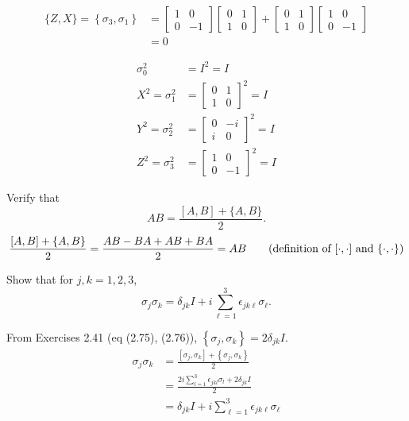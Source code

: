 \begin{align*}
\{Z, X\} = \left\{\sigma_3, \sigma_1 \right\} &= \begin{bmatrix}
1 & 0 \\
0 & -1
\end{bmatrix}
\begin{bmatrix}
0 & 1 \\
1 & 0
\end{bmatrix}
+
\begin{bmatrix}
0 & 1 \\
1 & 0
\end{bmatrix}
\begin{bmatrix}
1 & 0 \\
0 & -1
\end{bmatrix}\\
&=0
\end{align*}

\begin{align*}
	\sigma_0^2 &= I^2 = I\\
%
	X^2=\sigma_1^2 &= \begin{bmatrix}
	0 & 1 \\
	1 & 0
	\end{bmatrix} ^2 = I\\
%
	Y^2=\sigma_2^2 &= \begin{bmatrix}
	0 & -i \\
	i & 0
	\end{bmatrix} ^2 = I\\
%
	Z^2=\sigma_3^2 &= \begin{bmatrix}
	1 & 0 \\
	0 & -1
	\end{bmatrix} ^2 = I
\end{align*}



 Verify that $$AB = \frac{[A,B]+\{A,B\}}{2}.$$
\Soln
\begin{align*}
	\frac{\left[A, B \right] + \left\{A, B\right\}}{2} = \frac{AB - BA + AB + BA}{2} = AB \tag{definition of $[\cdot,\cdot]$ and $\{\cdot,\cdot\}$}
\end{align*}



 Show that for $j,k=1,2,3$, $$\sigma_j\sigma_k = \delta_{jk}I+i\sum_{\ell=1}^3\epsilon_{jk\ell}\sigma_\ell.$$

From Exercises 2.41 (eq (2.75), (2.76)), $\left\{\sigma_j,  \sigma_k \right\} = 2 \delta_{jk} I$.
\begin{align*}
	\sigma_j \sigma_k &= \frac{\left[\sigma_j, \sigma_k  \right] + \left\{\sigma_j, \sigma_k \right\}}{2}\tag{Exercise 2.42 (eq 2.77)}\\
		&= \frac{2i \sum_{l=1}^{3} \epsilon_{jkl}\sigma_l +  2 \delta_{jk} I}{2} \tag{Exercise 2.40 (eq 2.74) and above}\\
		&= \delta_{jk} I + i \sum_{\ell=1}^{3} \epsilon_{jk\ell}\sigma_\ell\tag{cancel 2s}
\end{align*}



